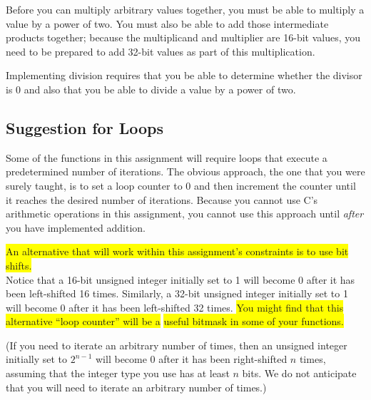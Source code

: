 Before you can multiply arbitrary values together, you must be able to multiply a value by a power of two.
You must also be able to add those intermediate products together;
because the multiplicand and multiplier are 16-bit values, you need to be prepared to add 32-bit values as part of this multiplication.

Implementing division requires that you be able to determine whether the divisor is 0 and also that you be able to divide a value by a power of two.



\subsection{Suggestion for Loops}

Some of the functions in this assignment will require loops that execute a predetermined number of iterations.
The obvious approach, the one that you were surely taught, is to set a loop counter to 0 and then increment the counter until it reaches the desired number of iterations.
Because you cannot use C's arithmetic operations in this assignment, you cannot use this approach until \textit{after} you have implemented addition.

\colorbox{yellow}{An alternative that will work within this assignment's constraints is to use bit shifts.} \\
Notice that a 16-bit unsigned integer initially set to 1 will become 0 after it has been left-shifted 16 times.
Similarly, a 32-bit unsigned integer initially set to 1 will become 0 after it has been left-shifted 32 times.
\colorbox{yellow}{You might find that this alternative ``loop counter'' will be a} \colorbox{yellow}{useful bitmask in some of your functions.}

(If you need to iterate an arbitrary number of times, then an unsigned integer initially set to $2^{n-1}$ will become 0 after it has been right-shifted $n$ times, assuming that the integer type you use has at least $n$ bits.
We do not anticipate that you will need to iterate an arbitrary number of times.)

